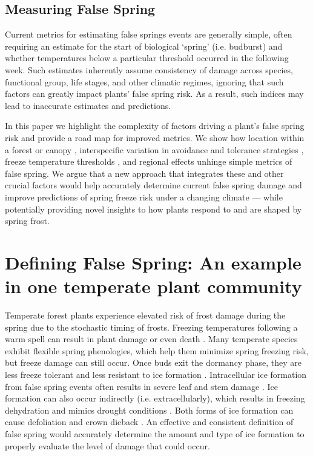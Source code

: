 \documentclass{article}\usepackage[]{graphicx}\usepackage[]{color}
\begin{document}
\subsection*{Measuring False Spring}
Current metrics for estimating false springs events are generally simple, often requiring an estimate for the start of biological `spring' (i.e. budburst) and whether temperatures below a particular threshold occurred in the following week. Such estimates inherently assume consistency of damage across species, functional group, life stages, and other climatic regimes, ignoring that such factors can greatly impact plants' false spring risk. As a result, such indices may lead to inaccurate estimates and predictions. %

In this paper we highlight the complexity of factors driving a plant's false spring risk and provide a road map for improved metrics. We show how location within a forest or canopy \citep{Augspurger2013}, interspecific variation in avoidance and tolerance strategies \citep{Martin2010, Muffler2016}, freeze temperature thresholds \citep{Lenz2013}, and regional effects \citep{Muffler2016} unhinge simple metrics of false spring. We argue that a new approach that integrates these and other crucial factors would help accurately determine current false spring damage and improve predictions of spring freeze risk under a changing climate --- while potentially providing novel insights to how plants respond to and are shaped by spring frost. %

\section*{Defining False Spring: An example in one temperate plant community}
Temperate forest plants experience elevated risk of frost damage during the spring due to the stochastic timing of frosts. Freezing temperatures following a warm spell can result in plant damage or even death \citep{Ludlum1968, Mock2007}. Many temperate species exhibit flexible spring phenologies, which help them minimize spring freezing risk, but freeze damage can still occur. Once buds exit the dormancy phase, they are less freeze tolerant and less resistant to ice formation \citep{ Lenz2013, Taschler2004, Vitasse2014a}. Intracellular ice formation from false spring events often results in severe leaf and stem damage \citep{Burke1976, Sakai1987}. Ice formation can also occur indirectly (i.e. extracellularly), which results in freezing dehydration and mimics drought conditions \citep{Beck2004, Hofmann2015, Pearce2001}. Both forms of ice formation can cause defoliation and crown dieback \citep{Gu2008}. An effective and consistent definition of false spring would accurately determine the amount and type of ice formation to properly evaluate the level of damage that could occur.
 
\end{document}
